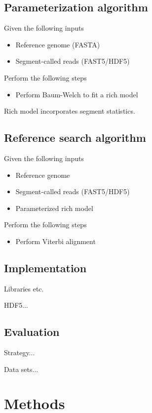 \documentclass[10pt]{article}
\begin{document}
\subsection{Parameterization algorithm}

Given the following inputs
\begin{itemize}
\item Reference genome (FASTA)
\item Segment-called reads (FAST5/HDF5)
\end{itemize}

Perform the following steps
\begin{itemize}
\item Perform Baum-Welch to fit a rich model
\end{itemize}

Rich model incorporates segment statistics.

\subsection{Reference search algorithm}

Given the following inputs
\begin{itemize}
\item Reference genome
\item Segment-called reads (FAST5/HDF5)
\item Parameterized rich model
\end{itemize}

Perform the following steps
\begin{itemize}
\item Perform Viterbi alignment
\end{itemize}

\subsection{Implementation}

Libraries etc.

HDF5...

\subsection{Evaluation}

Strategy...

Data sets...

\section{Methods}
\end{document}
